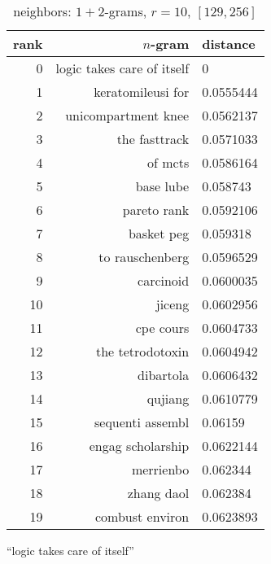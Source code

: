 \begin{table}[t]
\begin{subtable}[t]{.45\textwidth}
        \centering
        \begin{tabularx}{\textwidth}{r R l}
            \toprule
            rank & $n$-gram & distance\\
            \midrule
            \num{0} & logic takes care of itself & \num{0}\\
            \num{1} & keratomileusi for & \num{0.0555444}\\
            \num{2} & unicompartment knee & \num{0.0562137}\\
            \num{3} & the fasttrack & \num{0.0571033}\\
            \num{4} & of mcts & \num{0.0586164}\\
            \num{5} & base lube & \num{0.058743}\\
            \num{6} & pareto rank & \num{0.0592106}\\
            \num{7} & basket peg & \num{0.059318}\\
            \num{8} & to rauschenberg & \num{0.0596529}\\
            \num{9} & carcinoid & \num{0.0600035}\\
            \num{10} & jiceng & \num{0.0602956}\\
            \num{11} & cpe cours & \num{0.0604733}\\
            \num{12} & the tetrodotoxin & \num{0.0604942}\\
            \midrule
            \num{13} & dibartola & \num{0.0606432}\\
            \num{14} & qujiang & \num{0.0610779}\\
            \num{15} & sequenti assembl & \num{0.06159}\\
            \num{16} & engag scholarship & \num{0.0622144}\\
            \num{17} & merrienbo & \num{0.062344}\\
            \num{18} & zhang daol & \num{0.062384}\\
            \num{19} & combust environ & \num{0.0623893}\\
            \bottomrule
        \end{tabularx}
        \caption{\enquote{logic takes care of itself}}\label{tab:ranking_chance_2}
    \end{subtable}
    \caption{neighbors: $1+2$-grams, $r = 10$, $[129,256]$}\label{tab:ranking_chance}
\end{table}

